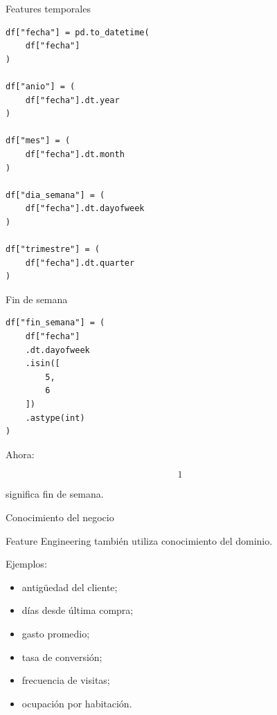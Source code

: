 \documentclass[aspectratio=169,11pt]{beamer}
\begin{document}

\begin{frame}[fragile]{Features temporales}

\begin{lstlisting}
df["fecha"] = pd.to_datetime(
    df["fecha"]
)

df["anio"] = (
    df["fecha"].dt.year
)

df["mes"] = (
    df["fecha"].dt.month
)

df["dia_semana"] = (
    df["fecha"].dt.dayofweek
)

df["trimestre"] = (
    df["fecha"].dt.quarter
)
\end{lstlisting}

\end{frame}


\begin{frame}[fragile]{Fin de semana}

\begin{lstlisting}
df["fin_semana"] = (
    df["fecha"]
    .dt.dayofweek
    .isin([
        5,
        6
    ])
    .astype(int)
)
\end{lstlisting}

Ahora:

\[
1
\]

significa fin de semana.

\end{frame}


\begin{frame}{Conocimiento del negocio}

Feature Engineering también utiliza conocimiento del dominio.

Ejemplos:

\begin{itemize}

    \item antigüedad del cliente;

    \item días desde última compra;

    \item gasto promedio;

    \item tasa de conversión;

    \item frecuencia de visitas;

    \item ocupación por habitación.

\end{itemize}

\end{frame}
\end{document}
